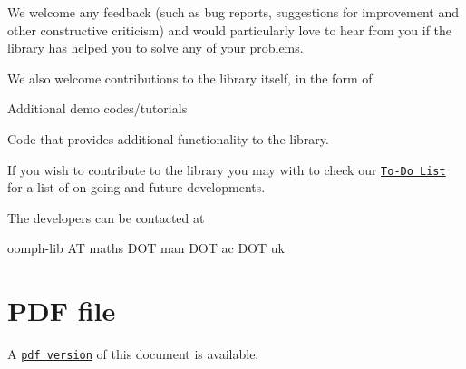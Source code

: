 We welcome any feedback (such as bug reports, suggestions for improvement and other constructive criticism) and would particularly love to hear from you if the library has helped you to solve any of your problems.

We also welcome contributions to the library itself, in the form of
\begin{DoxyItemize}
\item Additional demo codes/tutorials
\item Code that provides additional functionality to the library.
\end{DoxyItemize}If you wish to contribute to the library you may with to check our \href{../../ToDo/html/index.html}{\tt To-\/\-Do List} for a list of on-\/going and future developments.

The developers can be contacted at \begin{center} {\ttfamily  oomph-\/lib A\-T maths D\-O\-T man D\-O\-T ac D\-O\-T uk } \end{center}  \par




 

 \hypertarget{index_pdf}{}\section{P\-D\-F file}\label{index_pdf}
A \href{../latex/refman.pdf}{\tt pdf version} of this document is available. 